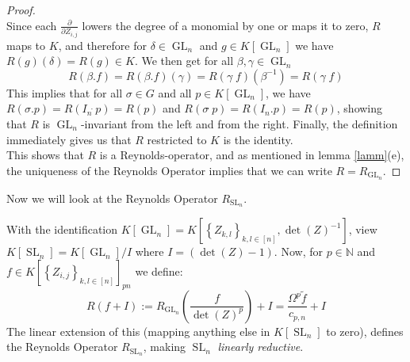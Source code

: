 \begin{proof}
\begin{equation}
  \end{equation}
  Since each $ \frac {\partial}{ \partial Z_{i,j} } $ lowers the degree of a monomial by one or maps it to zero, $R$ maps to $K$, and therefore for $ \delta \in \operatorname{GL}_n $ and $ g \in K \left\lbrack \operatorname{GL}_n \right\rbrack $ we have $ R(g)(\delta) = R(g) \in K $.
  We then get for all $ \beta,\gamma \in \operatorname{GL}_n $
  \begin{equation}
    R \left( \beta . f \right)
    = R \left( \beta . f \right) \left( \gamma \right) 
    = R \left( \gamma \dot{\phantom{.}} f \right) \left( \beta^{-1} \right) 
    = R \left( \gamma \dot{\phantom{.}} f \right)
  \end{equation}
  This implies that for all $\sigma \in G$ and all $p \in K[\operatorname{GL}_n]$, we have $R(\sigma.p) = R(I_n\dot{\phantom{.}}p) = R(p)$ and $R(\sigma\dot{\phantom{.}}p) = R(I_n.p)=R(p)$, showing that $R$ is $\operatorname{GL}_n$-invariant from the left and from the right.
  Finally, the definition immediately gives us that $R$ restricted to $K$ is the identity.  \\
  This shows that $R$ is a Reynolds-operator, and as mentioned in lemma \ref{lamm}(e), the uniqueness of the Reynolds Operator implies that we can write $ R = R_{\operatorname{GL}_n} $.
\end{proof}

Now we will look at the Reynolds Operator $R_{\operatorname{SL}_n}$.

\begin{corollary}\label{esel}
  With the identification $ K \left\lbrack \operatorname{GL}_n \right\rbrack = K \left\lbrack \left\{ Z_{k,l} \right\}_{k,l \in [ n ]} , \operatorname{det} (Z) ^{-1} \right\rbrack $, view $ K \left\lbrack \operatorname{SL}_n \right\rbrack = K \left\lbrack \operatorname{GL}_n \right\rbrack / I $ where $ I = \left( \operatorname{det} (Z) -1 \right) $.
  Now, for $ p \in \mathbb{N} $ and $ f \in K \left\lbrack \left\{ Z_{i,j} \right\}_{k,l \in [ n ]} \right\rbrack_{pn} $ we define:
  \begin{equation}
    R ( f + I )
    := R_{\operatorname{GL}_n} \left( \frac{f}{\operatorname{det}(Z)^p} \right) + I
    = \frac{\Omega^p \tilde{f}}{c_{p,n}} + I
  \end{equation}
  The linear extension of this (mapping anything else in $K \left\lbrack \operatorname{SL}_n \right\rbrack$ to zero), defines the Reynolds Operator $R_{\operatorname{SL}_n}$, making $\operatorname{SL}_n$ \textit{linearly reductive}.
\end{corollary}

